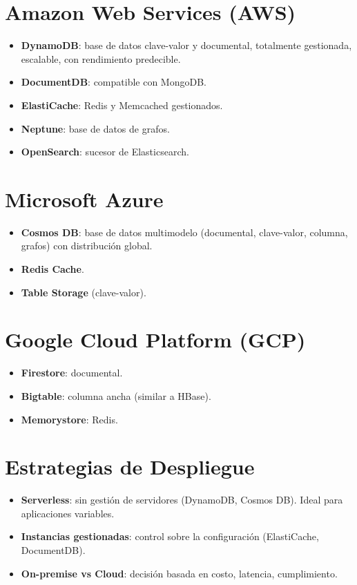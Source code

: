 \documentclass[12pt,a4paper,openany,oneside]{book}
\begin{document}
\section{Amazon Web Services (AWS)}
\begin{itemize}
    \item \textbf{DynamoDB}: base de datos clave-valor y documental, totalmente gestionada, escalable, con rendimiento predecible.
    \item \textbf{DocumentDB}: compatible con MongoDB.
    \item \textbf{ElastiCache}: Redis y Memcached gestionados.
    \item \textbf{Neptune}: base de datos de grafos.
    \item \textbf{OpenSearch}: sucesor de Elasticsearch.
\end{itemize}

\section{Microsoft Azure}
\begin{itemize}
    \item \textbf{Cosmos DB}: base de datos multimodelo (documental, clave-valor, columna, grafos) con distribución global.
    \item \textbf{Redis Cache}.
    \item \textbf{Table Storage} (clave-valor).
\end{itemize}

\section{Google Cloud Platform (GCP)}
\begin{itemize}
    \item \textbf{Firestore}: documental.
    \item \textbf{Bigtable}: columna ancha (similar a HBase).
    \item \textbf{Memorystore}: Redis.
\end{itemize}

\section{Estrategias de Despliegue}
\begin{itemize}
    \item \textbf{Serverless}: sin gestión de servidores (DynamoDB, Cosmos DB). Ideal para aplicaciones variables.
    \item \textbf{Instancias gestionadas}: control sobre la configuración (ElastiCache, DocumentDB).
    \item \textbf{On-premise vs Cloud}: decisión basada en costo, latencia, cumplimiento.
\end{itemize}
\end{document}
